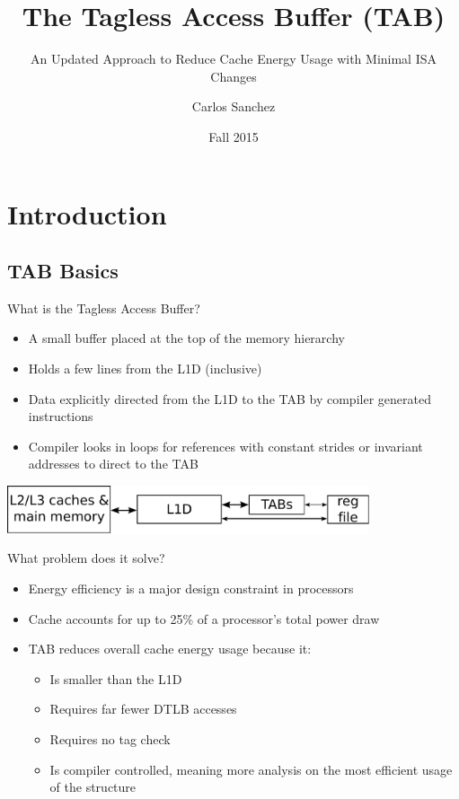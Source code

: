\documentclass{beamer}
\title[TAB v2] %
{The Tagless Access Buffer (TAB)}
\subtitle{An Updated Approach to Reduce Cache Energy Usage with Minimal ISA Changes}
\author{Carlos Sanchez}
\institute[FSU]
{Computer Science Department\\ Florida State University}
\date{Fall 2015}
\begin{document}
 
\frame{\titlepage} 
\section{Introduction}
\subsection{TAB Basics}
\begin{frame}{What is the Tagless Access Buffer?}
   \begin{itemize}
      \item A small buffer placed at the top of the memory hierarchy
      \item Holds a few lines from the L1D (inclusive)
      \item Data explicitly directed from the L1D to the TAB by compiler 
         generated instructions
      \item Compiler looks in loops for references with constant strides
         or invariant addresses to direct to the TAB
   \end{itemize}
   \begin{center}
      \includegraphics[width=0.8\textwidth]{figures/dmemhier.pdf}
   \end{center}
\end{frame}
\begin{frame}{What problem does it solve?}
   \begin{itemize}
      \item Energy efficiency is a major design constraint in processors
      \item Cache accounts for up to 25\% of a processor's total power draw
      \item TAB reduces overall cache energy usage because it:
         \begin{itemize}
            \item Is smaller than the L1D
            \item Requires far fewer DTLB accesses
            \item Requires no tag check
            \item Is compiler controlled, meaning more analysis on the most
               efficient usage of the structure
         \end{itemize}
   \end{itemize}
\end{frame}
\end{document}
